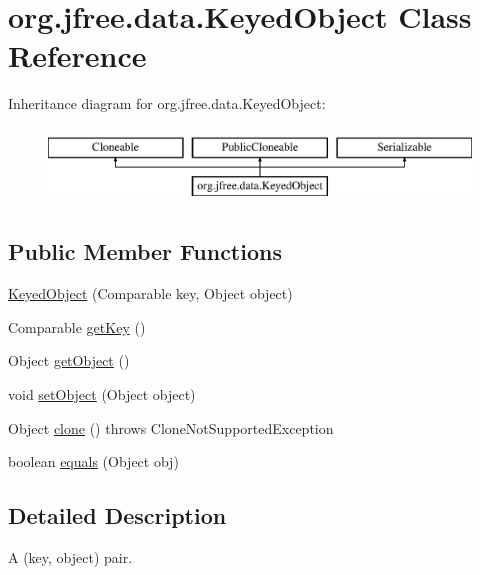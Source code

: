 \hypertarget{classorg_1_1jfree_1_1data_1_1_keyed_object}{}\section{org.\+jfree.\+data.\+Keyed\+Object Class Reference}
\label{classorg_1_1jfree_1_1data_1_1_keyed_object}
Inheritance diagram for org.\+jfree.\+data.\+Keyed\+Object\+:\begin{figure}[H]
\begin{center}
\leavevmode
\includegraphics[height=2.000000cm]{classorg_1_1jfree_1_1data_1_1_keyed_object}
\end{center}
\end{figure}
\subsection*{Public Member Functions}
\begin{DoxyCompactItemize}
\item 
\mbox{\hyperlink{classorg_1_1jfree_1_1data_1_1_keyed_object_a40c182c70a4b378797174c268b841df6}{Keyed\+Object}} (Comparable key, Object object)
\item 
Comparable \mbox{\hyperlink{classorg_1_1jfree_1_1data_1_1_keyed_object_af96241323eb2253798fe035426d26bf5}{get\+Key}} ()
\item 
Object \mbox{\hyperlink{classorg_1_1jfree_1_1data_1_1_keyed_object_a4d4505544f85146e208a7e9fc39750ec}{get\+Object}} ()
\item 
void \mbox{\hyperlink{classorg_1_1jfree_1_1data_1_1_keyed_object_a55bed2accc2530ac9b5988a77301e8d6}{set\+Object}} (Object object)
\item 
Object \mbox{\hyperlink{classorg_1_1jfree_1_1data_1_1_keyed_object_a8e65b6440ec9f72f892239008eed3bab}{clone}} ()  throws Clone\+Not\+Supported\+Exception 
\item 
boolean \mbox{\hyperlink{classorg_1_1jfree_1_1data_1_1_keyed_object_a5fa44f8434da1f2393d777f9e65e77b0}{equals}} (Object obj)
\end{DoxyCompactItemize}


\subsection{Detailed Description}
A (key, object) pair. 

